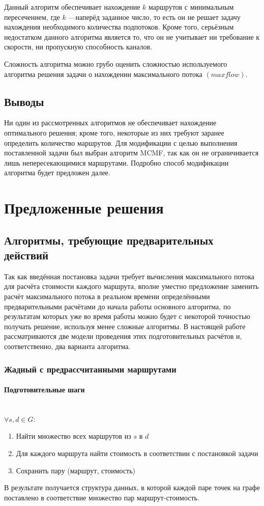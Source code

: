 \documentclass[a4paper]{article}
\begin{document}
Данный алгоритм обеспечивает нахождение $k$ маршрутов с минимальным пересечением, где $k$ ---наперёд заданное число, то есть он не решает задачу нахождения необходимого количества подпотоков. Кроме того, серьёзным недостатком данного алгоритма является то, что он не учитывает ни требование к скорости, ни пропускную способность каналов.

Сложность алгоритма можно грубо оценить сложностью используемого алгоритма решения задачи о нахождении максимального потока $(maxflow)$.

\subsection{Выводы}
Ни один из рассмотренных алгоритмов не обеспечивает нахождение оптимального решения; кроме того, некоторые из них требуют заранее определить количество маршрутов. Для модификации с целью выполнения поставленной задачи был выбран алгоритм MCMF, так как он не ограничивается лишь непересекающимися маршрутами. Подробно способ модификации алгоритма будет предложен далее.

\newpage
\section{Предложенные решения}
\subsection{Алгоритмы, требующие предварительных действий}
Так как введённая постановка задачи требует вычисления максимального потока для расчёта стоимости каждого маршрута, вполне уместно предложение заменить расчёт максимального потока в реальном времени определёнными предварительными расчётами до начала работы основного алгоритма, по результатам которых уже во время работы можно будет с некоторой точностью получать решение, используя менее сложные алгоритмы. В настоящей работе рассматриваются две модели проведения этих подготовительных расчётов и, соответственно, два варианта алгоритма. 

\subsubsection{Жадный с предрассчитанными маршрутами} 
\paragraph{Подготовительные шаги}\mbox{}\\
$\forall s, d \in G: $
\begin{enumerate}
\item Найти множество всех маршрутов из $s$ в $d$
\item Для каждого маршрута найти стоимость в соответствии с постановкой задачи
\item Сохранить пару (маршрут, стоимость)
\end{enumerate}
В результате получается структура данных, в которой каждой паре точек на графе поставлено в соответствие множество пар маршрут-стоимость.
\end{document}
